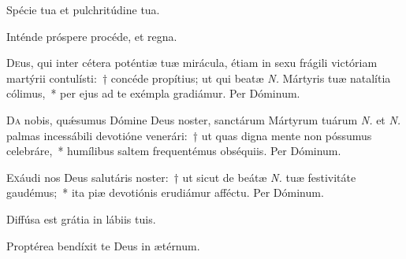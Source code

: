 \documentclass[vesperale_romanum.tex]{subfiles}
\begin{document}

\newpage
\altertonus


\vel



\vv Spécie tua et pulchritúdine tua. \tpalleluia

\rr Inténde próspere procéde, et regna. \tpalleluia



\lettrine{D}{e}us, qui inter cétera poténtiæ tuæ mirácula, étiam in sexu frágili vi\-ctóriam martýrii contulísti:~† concéde propítius; ut qui beatæ \textit{N.} Mártyris tuæ natalítia cólimus,~* per ejus ad te exémpla gradiámur. Per Dóminum.


\lettrine{D}{a} nobis, quǽsumus Dómine Deus noster, san\-ctárum Mártyrum tuárum \textit{N.} et \textit{N.} palmas incessábili devotióne venerári:~† ut quas digna mente non póssumus celebráre,~* humílibus saltem frequentémus obséquiis. Per Dóminum.


\lettrine{E}{x}áudi nos Deus salutáris noster:~† ut sicut de beátæ \textit{N.} tuæ festivitáte gaudémus;~* ita piæ devotiónis erudiámur affé\-ctu.
Per Dóminum.


\omniapraeter %

\vv Diffúsa est grátia in lábiis tuis. \tpalleluia

\rr Proptérea bendíxit te Deus in ætérnum. \tpalleluia

\end{document}
